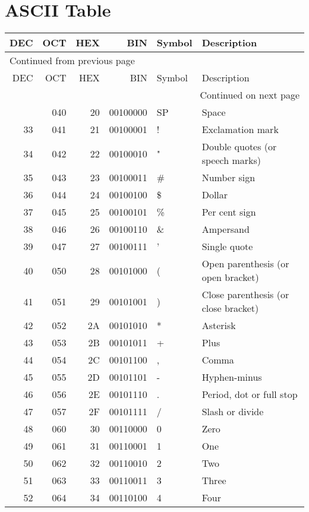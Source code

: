 \documentclass[11pt]{article}
\begin{document}
 \newpage
\section{ASCII Table}
\label{sec:org705b98e}

\begin{longtable}{rrrrll}
DEC & OCT & HEX & BIN & Symbol & Description\\
\hline
\endfirsthead
\multicolumn{6}{l}{Continued from previous page} \\
\hline

DEC & OCT & HEX & BIN & Symbol & Description \\

\hline
\endhead
\hline\multicolumn{6}{r}{Continued on next page} \\
\endfoot
\endlastfoot
\hline
32 & 040 & 20 & 00100000 & SP & Space\\
33 & 041 & 21 & 00100001 & ! & Exclamation mark\\
34 & 042 & 22 & 00100010 & " & Double quotes (or speech marks)\\
35 & 043 & 23 & 00100011 & \# & Number sign\\
36 & 044 & 24 & 00100100 & \$ & Dollar\\
37 & 045 & 25 & 00100101 & \% & Per cent sign\\
38 & 046 & 26 & 00100110 & \& & Ampersand\\
39 & 047 & 27 & 00100111 & ' & Single quote\\
40 & 050 & 28 & 00101000 & ( & Open parenthesis (or open bracket)\\
41 & 051 & 29 & 00101001 & ) & Close parenthesis (or close bracket)\\
42 & 052 & 2A & 00101010 & * & Asterisk\\
43 & 053 & 2B & 00101011 & + & Plus\\
44 & 054 & 2C & 00101100 & , & Comma\\
45 & 055 & 2D & 00101101 & - & Hyphen-minus\\
46 & 056 & 2E & 00101110 & . & Period, dot or full stop\\
47 & 057 & 2F & 00101111 & / & Slash or divide\\
48 & 060 & 30 & 00110000 & 0 & Zero\\
49 & 061 & 31 & 00110001 & 1 & One\\
50 & 062 & 32 & 00110010 & 2 & Two\\
51 & 063 & 33 & 00110011 & 3 & Three\\
52 & 064 & 34 & 00110100 & 4 & Four\\

\end{longtable}
\end{document}
